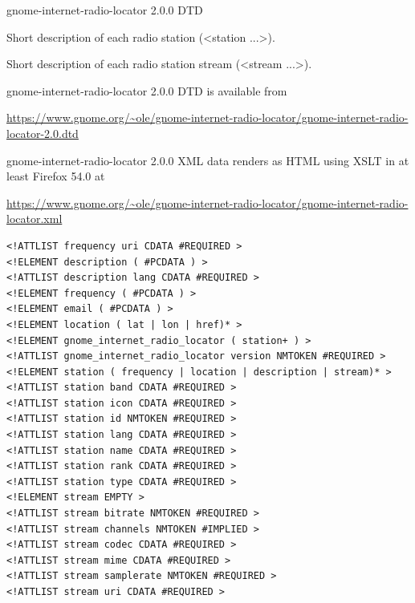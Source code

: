 \documentclass[20pt,landscape]{foils}
\begin{document}

\begin{list1}
\item gnome-internet-radio-locator 2.0.0 DTD
\item Short description of each radio station (<station ...>).
\item Short description of each radio station stream (<stream ...>).
\item gnome-internet-radio-locator 2.0.0 DTD is available from \begin{tiny}\url{https://www.gnome.org/~ole/gnome-internet-radio-locator/gnome-internet-radio-locator-2.0.dtd}\end{tiny}
\item gnome-internet-radio-locator 2.0.0 XML data renders as HTML using XSLT in at least Firefox 54.0 at \begin{tiny}\url{https://www.gnome.org/~ole/gnome-internet-radio-locator/gnome-internet-radio-locator.xml}\end{tiny}
\end{list1}



\begin{tiny}
\begin{verbatim}
<!ATTLIST frequency uri CDATA #REQUIRED >
<!ELEMENT description ( #PCDATA ) >
<!ATTLIST description lang CDATA #REQUIRED >
<!ELEMENT frequency ( #PCDATA ) >
<!ELEMENT email ( #PCDATA ) >
<!ELEMENT location ( lat | lon | href)* >
<!ELEMENT gnome_internet_radio_locator ( station+ ) >
<!ATTLIST gnome_internet_radio_locator version NMTOKEN #REQUIRED >
<!ELEMENT station ( frequency | location | description | stream)* >
<!ATTLIST station band CDATA #REQUIRED >
<!ATTLIST station icon CDATA #REQUIRED >
<!ATTLIST station id NMTOKEN #REQUIRED >
<!ATTLIST station lang CDATA #REQUIRED >
<!ATTLIST station name CDATA #REQUIRED >
<!ATTLIST station rank CDATA #REQUIRED >
<!ATTLIST station type CDATA #REQUIRED >
<!ELEMENT stream EMPTY >
<!ATTLIST stream bitrate NMTOKEN #REQUIRED >
<!ATTLIST stream channels NMTOKEN #IMPLIED >
<!ATTLIST stream codec CDATA #REQUIRED >
<!ATTLIST stream mime CDATA #REQUIRED >
<!ATTLIST stream samplerate NMTOKEN #REQUIRED >
<!ATTLIST stream uri CDATA #REQUIRED >
\end{verbatim}
\end{tiny}

\end{document}
